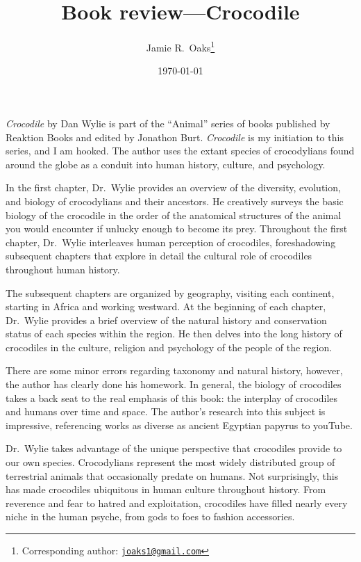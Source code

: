 \documentclass[letterpaper,12pt]{article}
\title{Book review---Crocodile}
\author[1]{Jamie R.\ Oaks\thanks{Corresponding author: \href{mailto:joaks1@gmail.com}{\tt joaks1@gmail.com}}}
\affil[1]{Department of Biology, University of Washington, Seattle, Washington 98195}
\date{\today}
\newcommand{\croc}{\emph{Crocodile}\xspace}
\begin{document}
\maketitle

\newpage
\doublespacing

\croc by Dan Wylie \citep{Wylie2013} is part of the ``Animal'' series of books
published by Reaktion Books and edited by Jonathon Burt.
\croc is my initiation to this series, and I am hooked.
The author uses the extant species of crocodylians found around the globe as a
conduit into human history, culture, and psychology.

In the first chapter, Dr.\ Wylie provides an overview
of the diversity, evolution, and biology of crocodylians and their ancestors.
He creatively surveys the basic biology of the crocodile in the order of the
anatomical structures of the animal you would encounter if unlucky enough to
become its prey.
Throughout the first chapter, Dr.\ Wylie interleaves human perception of
crocodiles, foreshadowing subsequent chapters that explore in detail the
cultural role of crocodiles throughout human history.

The subsequent chapters are organized by geography, visiting each continent,
starting in Africa and working westward.
At the beginning of each chapter, Dr.\ Wylie provides a brief overview of the
natural history and conservation status of each species within the region.
He then delves into the long history of crocodiles in the culture, religion and
psychology of the people of the region.

There are some minor errors regarding taxonomy and natural history, however,
the author has clearly done his homework.
In general, the biology of crocodiles takes a back seat to the real emphasis of
this book: the interplay of crocodiles and humans over time and space.
The author's research into this subject is impressive, referencing works as
diverse as ancient Egyptian papyrus to youTube.

Dr.\ Wylie takes advantage of the unique perspective that crocodiles provide
to our own species.
Crocodylians represent the most widely distributed group of terrestrial animals
that occasionally predate on humans.
Not surprisingly, this has made crocodiles ubiquitous in human culture
throughout history.
From reverence and fear to hatred and exploitation, crocodiles have filled
nearly every niche in the human psyche, from gods to foes to fashion
accessories.



\end{document}
